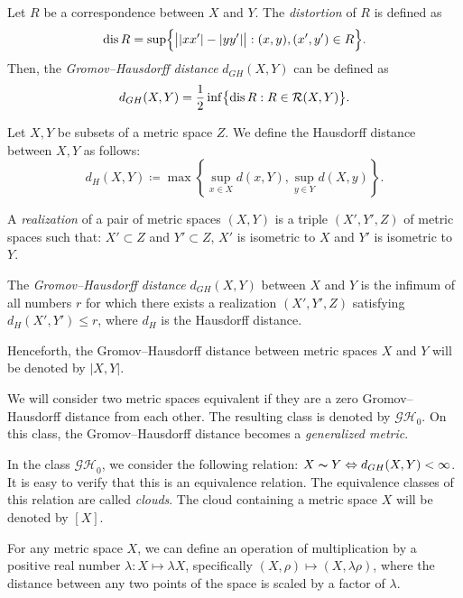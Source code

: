 \begin{definition}
  Let $ R $ be a correspondence between $ X $ and $ Y $. The
  \emph{distortion} of $ R $ is defined as
  $$
  \operatorname{dis}{R} = \sup \Bigl\{ \big| |xx'| - |yy'| \big| : (x, y), (x', y')
  \in R \Bigr\}.
  $$
  Then, the \emph{Gromov--Hausdorff distance} $ d_{GH}(X,Y) $ can
  be defined as
  $$
  d_{GH}(X,Y) = \frac{1}{2} \inf \bigl\{ \operatorname{dis}{R} : R \in
  \mathcal{R}(X,Y) \bigr\}.
  $$
  \label{defSootvet}
\end{definition}
\begin{definition}
  Let $X,Y$ be subsets of a metric space $Z$. We define the Hausdorff
  distance between $X,Y$ as follows:
  $$
  d_H(X, Y) \coloneqq \max \left\{ \sup_{x \in X} d(x, Y), \sup_{y
  \in Y} d(X, y) \right\}.
  $$
\end{definition}
\begin{definition}
  A \emph{realization} of a pair of metric spaces $ (X,Y) $ is a
  triple $ (X', Y', Z) $ of metric spaces such that:
  $ X' \subset Z $ and $ Y' \subset Z $,
  $ X' $ is isometric to $ X $ and
  $ Y' $ is isometric to $ Y $.

  The \emph{Gromov--Hausdorff distance} $ d_{GH}(X,Y) $ between $ X $
  and $ Y $ is the infimum of all numbers $ r $ for which there
  exists a realization $ (X', Y', Z) $ satisfying $ d_H(X', Y') \leq
  r $, where $ d_H $ is the Hausdorff distance.
\end{definition}

Henceforth, the Gromov--Hausdorff distance between metric spaces $ X
$ and $ Y $ will be denoted by $ |X,Y| $.

We will consider two metric spaces equivalent if they are a zero
Gromov--Hausdorff distance from each other. The resulting class is
denoted by $ \mathcal{GH}_0 $. On this class, the Gromov--Hausdorff
distance becomes a \emph{generalized metric}.

\begin{definition}
  In the class $\mathcal{GH}_{0}$, we consider the following
  relation: $X \thicksim Y \Leftrightarrow d_{GH}(X, Y) < \infty$. It
  is easy to verify that this is an equivalence relation. The
  equivalence classes of this relation are called \emph{clouds}. The
  cloud containing a metric space $X$ will be denoted by $[X]$.
\end{definition}

For any metric space $X$, we can define an operation of
multiplication by a positive real number $\lambda\colon X\mapsto
\lambda X$, specifically $(X, \rho) \mapsto (X, \lambda \rho)$, where
the distance between any two points of the space is scaled by a
factor of $\lambda$.


